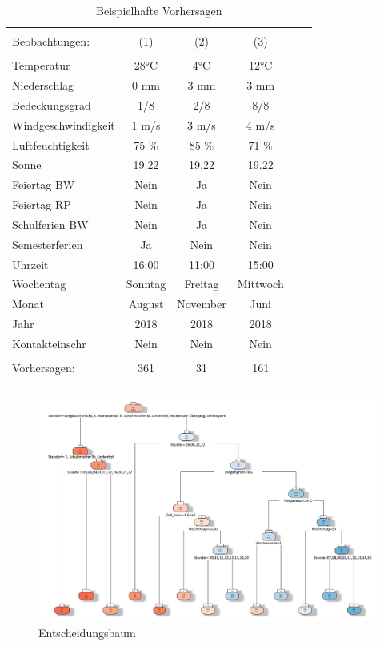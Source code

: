 \documentclass[a4paper,12pt]{thesis}
\begin{document}
\begin{table}[!htbp] \centering 
	\caption{Beispielhafte Vorhersagen} 
	\label{ForecastsExample} 
	\begin{tabular}{@{\extracolsep{-5pt}}lccccc} 
		\\[-1.8ex]\hline 
		\hline \\[-1.8ex] 
		Beobachtungen: & (1) & (2) & (3) \\ 
		\hline \\[-1.8ex] 
		Temperatur & 28°C & 4°C & 12°C\\
		Niederschlag & 0 mm & 3 mm &  3 mm\\
		Bedeckungsgrad & 1/8 & 2/8 & 8/8\\
		Windgeschwindigkeit &  1 m/s & 3 m/s & 4 m/s\\
		Luftfeuchtigkeit &  75 \% & 85 \% & 71 \% \\
		Sonne & 19.22 & 19.22 & 19.22\\
		Feiertag BW & Nein & Ja & Nein \\
		Feiertag RP & Nein & Ja & Nein \\
		Schulferien BW & Nein & Ja & Nein \\
		Semesterferien & Ja & Nein & Nein \\
		Uhrzeit & 16:00 & 11:00 & 15:00 \\
		Wochentag & Sonntag & Freitag & Mittwoch \\
		Monat & August & November & Juni \\
		Jahr & 2018 & 2018 & 2018 \\
		Kontakteinschr & Nein & Nein & Nein \\
		\hline \\[-1.8ex]
		Vorhersagen: & 361 & 31 & 161 \\ 
		\hline \\[-1.8ex] 
	\end{tabular} 
\end{table} 

\begin{figure}[!ht]
	\centering
	\includegraphics[width=\textwidth]{Plots/Entscheidungsbaum.png}
	\caption{Entscheidungsbaum}
	\label{DecisionTree}
\end{figure}

\newpage
{}

\end{document}
